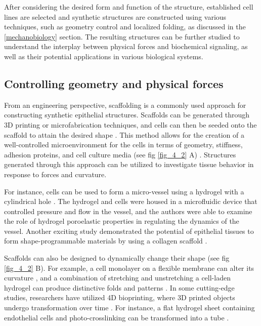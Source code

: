 After considering the desired form and function of the structure, established cell lines are selected and synthetic structures are constructed using various techniques, such as geometry control and localized folding, as discussed in the \ref{mechanobiology} section. The resulting structures can be further studied to understand the interplay between physical forces and biochemical signaling, as well as their potential applications in various biological systems.

\hypertarget{controlling-geometry-and-physical-forces}{%
	\subsection{Controlling geometry and physical 		forces}\label{controlling-geometry-and-physical-forces}}

From an engineering perspective, scaffolding is a commonly used approach for constructing synthetic epithelial structures. Scaffolds can be generated through 3D printing or microfabrication techniques, and cells can then be seeded onto the scaffold to attain the desired shape \cite{torras2018}. This method allows for the creation of a well-controlled microenvironment for the cells in terms of geometry, stiffness, adhesion proteins, and cell culture media (see fig \ref{fig_4_2} A) . Structures generated through this approach can be utilized to investigate tissue behavior in response to forces and curvature.

For instance, cells can be used to form a micro-vessel using a hydrogel with a cylindrical hole \cite{dessalles2021}. The hydrogel and cells were housed in a microfluidic device that controlled pressure and flow in the vessel, and the authors were able to examine the role of hydrogel poroelastic properties in regulating the dynamics of the vessel. Another exciting study demonstrated the potential of epithelial tissues to form shape-programmable materials by using a collagen scaffold \cite{mailand2022}.

Scaffolds can also be designed to dynamically change their shape (see fig \ref{fig_4_2} B). For example, a cell monolayer on a flexible membrane can alter its curvature \cite{blonski2021}, and a combination of stretching and unstretching a cell-laden hydrogel can produce distinctive folds and patterns \cite{chan2018}. In some cutting-edge studies, researchers have utilized 4D bioprinting, where 3D printed objects undergo transformation over time \cite{arif2022}. For instance, a flat hydrogel sheet containing endothelial cells and photo-crosslinking can be transformed into a tube \cite{zhang2020}.


